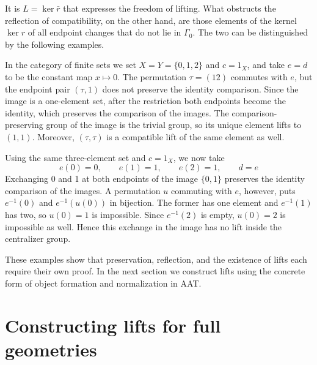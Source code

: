 It is $L=\ker\bar r$ that expresses the freedom of lifting.
What obstructs the reflection of compatibility, on the other hand, are those elements of the
kernel $\ker r$ of all endpoint changes that do not lie in $\Gamma_0$.
The two can be distinguished by the following examples.

\begin{example}\label{ex:7.15}

In the category of finite sets we set $X=Y=\{0,1,2\}$ and $c=1_X$, and take $e=d$ to be the
constant map $x\mapsto0$.
The permutation $\tau=(12)$ commutes with $e$, but the endpoint pair $(\tau,1)$ does not
preserve the identity comparison.
Since the image is a one-element set, after the restriction both endpoints become the
identity, which preserves the comparison of the images.
The comparison-preserving group of the image is the trivial group, so its unique element
lifts to $(1,1)$.
Moreover, $(\tau,\tau)$ is a compatible lift of the same element as well.

\end{example}

\begin{example}\label{ex:7.16}

Using the same three-element set and $c=1_X$, we now take
\begin{equation*}
e(0)=0,\qquad e(1)=1,\qquad e(2)=1,
\qquad d=e
\tag{7.22}\label{eq:7.22}
\end{equation*}
Exchanging 0 and 1 at both endpoints of the image $\{0,1\}$ preserves the identity
comparison of the images.
A permutation $u$ commuting with $e$, however, puts $e^{-1}(0)$ and $e^{-1}(u(0))$ in
bijection.
The former has one element and $e^{-1}(1)$ has two, so $u(0)=1$ is impossible.
Since $e^{-1}(2)$ is empty, $u(0)=2$ is impossible as well.
Hence this exchange in the image has no lift inside the centralizer group.

These examples show that preservation, reflection, and the existence of lifts each require
their own proof.
In the next section we construct lifts using the concrete form of object formation and
normalization in AAT.

\end{example}

\section{Constructing lifts for full geometries}\label{sec:7.5}

